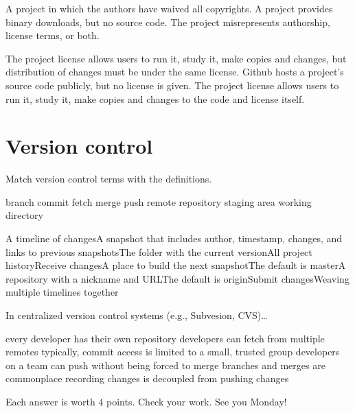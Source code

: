\documentclass[addpoints,answers]{exam}
\begin{document}
\begin{questions}

\question A project in which the authors have waived all copyrights. \answerline[F]
\question A project provides binary downloads, but no source code. \answerline[E]
\question The project misrepresents authorship, license terms, or both. \answerline[D]

\question The project license allows users to run it, study it, make copies and changes, but distribution of changes must be under the same license. \answerline[B]
\question Github hosts a project's source code publicly, but no license is given. \answerline[A]
\question The project license allows users to run it, study it, make copies and changes to the code and license itself. \answerline[C]

\section{Version control}

Match version control terms with the definitions.

\begin{oneparchoices}
\choice branch
\choice commit
\choice fetch
\choice merge
\choice push
\choice remote
\choice repository
\choice staging area
\choice working directory
\end{oneparchoices}

\question A timeline of changes\answerline[A]
\question A snapshot that includes author, timestamp, changes, and links to previous snapshots\answerline[B]
\question The folder with the current version\answerline[I]
\question All project history\answerline[G]
\question Receive changes\answerline[C]
\question A place to build the next snapshot\answerline[H]
\question The default is master\answerline[A]
\question A repository with a nickname and URL\answerline[F]
\question The default is origin\answerline[F]
\question Submit changes\answerline[E]
\question Weaving multiple timelines together\answerline[D]

\question In centralized version control systems (e.g., Subvesion, CVS)\ldots

\begin{choices}
\choice every developer has their own repository
\choice developers can fetch from multiple remotes
\choice typically, commit access is limited to a small, trusted group
\choice developers on a team can push without being forced to merge
\choice branches and merges are commonplace
\choice recording changes is decoupled from pushing changes
\end{choices}

\answerline[C]

\end{questions}

Each answer is worth $4$ points. Check your work. See you Monday!
\end{document}

